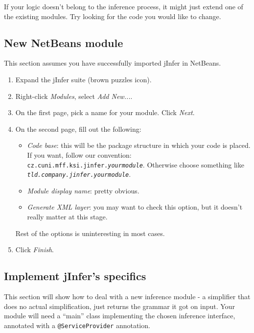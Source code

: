 \documentclass[a4paper,10pt,oneside]{article}
\def\.{\discretionary{}{}{}}
\begin{document}
  \par 
    If your logic doesn't belong to the inference process, it might just extend
    one of the existing modules. Try looking for the code you would like to change.
  
\subsection*{New NetBeans module}
\par 
  This section assumes you have successfully imported jInfer in NetBeans.

\begin{enumerate}
  \item Expand the jInfer suite (brown puzzles icon).
  \item Right-click \textit{Modules}, select \textit{Add New...}.
  \item On the first page, pick a name for your module. Click \textit{Next}.
  \item On the second page, fill out the following:
    \begin{itemize}
      \item 
        \textit{Code base}: this will be the package structure in which your code is placed.
        If you want, follow our convention: \texttt{cz.cuni.mff.ksi.jinfer.\textit{yourmodule}}.
        Otherwise choose something like \texttt{\textit{tld.\.company.\.jinfer.\.yourmodule}}.
      
      \item \textit{Module display name}: pretty obvious.
      \item \textit{Generate XML layer}: you may want to check this option, but it doesn't really matter at this stage.
    \end{itemize}
    Rest of the options is uninteresting in most cases.
  
  \item Click \textit{Finish}.
\end{enumerate}
\subsection*{Implement jInfer's specifics}
\par 
This section will show how to deal with a new inference module - a simplifier
that does no actual simplification, just returns the grammar it got on input.
Your module will need a ``main'' class implementing the chosen inference
interface, annotated with a \texttt{@ServiceProvider} annotation.
\end{document}
